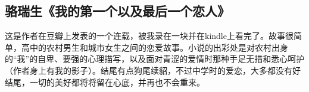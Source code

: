 \subsection{骆瑞生《我的第一个以及最后一个恋人》}

这是作者在豆瓣上发表的一个连载，被我录在一块并在kindle上看完了。故事很简单，高中的农村男生和城市女生之间的恋爱故事。小说的出彩处是对农村出身的“我”的自卑、要强的心理描写，以及面对青涩的爱情时那种手足无措和悉心呵护（作者身上有我的影子）。结尾有点狗尾续貂，不过中学时的爱恋，大多都没有好结尾，一切的美好都将将留在心底，并再也不会重来。

